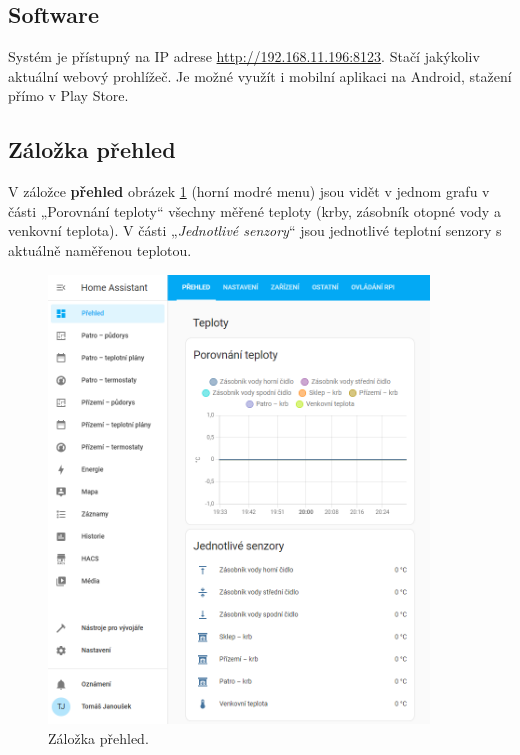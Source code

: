 \begin{Czech}
\section{Software}
\end{Czech}

\begin{Czech}
Systém je přístupný na IP adrese \url{http://192.168.11.196:8123}. Stačí jakýkoliv aktuální webový prohlížeč. Je možné využít i mobilní aplikaci na Android, stažení přímo v Play Store.
\end{Czech}

\begin{Czech}
\subsection{Záložka přehled}
\end{Czech}

\begin{Czech}
V záložce \textbf{přehled} obrázek \ref{fig:tab-overview} (horní modré menu) jsou vidět v jednom grafu v části „Porovnání teploty“ všechny měřené teploty (krby, zásobník otopné vody a venkovní teplota). V části „\textit{Jednotlivé senzory}“ jsou jednotlivé teplotní senzory s aktuálně naměřenou teplotou. 
\end{Czech}

\begin{Czech}
\begin{figure}[H]
    \centering
    \includegraphics[width=0.9\textwidth]{pictures/czech/software/tab-overview.png}
    \caption{Záložka přehled.}
    \label{fig:tab-overview}
\end{figure}
\end{Czech}


